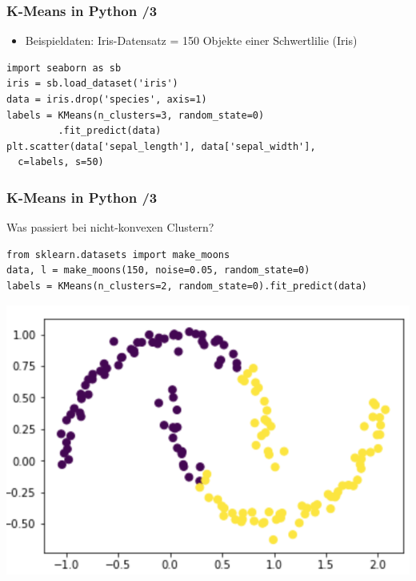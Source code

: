 
\begin{frame}[fragile]
\frametitle{K-Means in Python /3}

\begin{itemize}
\item Beispieldaten: Iris-Datensatz = 150 Objekte einer Schwertlilie (Iris)
\end{itemize}
\begin{verbatim}
import seaborn as sb
iris = sb.load_dataset('iris')
data = iris.drop('species', axis=1)
labels = KMeans(n_clusters=3, random_state=0) 
         .fit_predict(data)
plt.scatter(data['sepal_length'], data['sepal_width'], 
  c=labels, s=50)
\end{verbatim}
\end{frame}

\begin{frame}[fragile]
\frametitle{K-Means in Python /3}

Was passiert bei nicht-konvexen Clustern?
\begin{verbatim}
from sklearn.datasets import make_moons
data, l = make_moons(150, noise=0.05, random_state=0)
labels = KMeans(n_clusters=2, random_state=0).fit_predict(data)
\end{verbatim}

\vspace*{-.5cm}
\begin{center}
\includegraphics[scale=.5]{fig7/kmeans-moon.png}
\end{center}

\end{frame}

